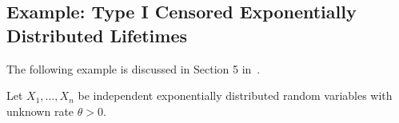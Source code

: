 \subsection{Example: Type I Censored Exponentially Distributed Lifetimes}
\label{section:Type I Censored Exponentially Distributed Lifetimes}

The following example is discussed in Section 5 in~\cite{Lindqvist2025simulated}.

Let $X_1 , \ldots , X_n$ be independent exponentially distributed random variables with unknown rate $\theta>0$. 
